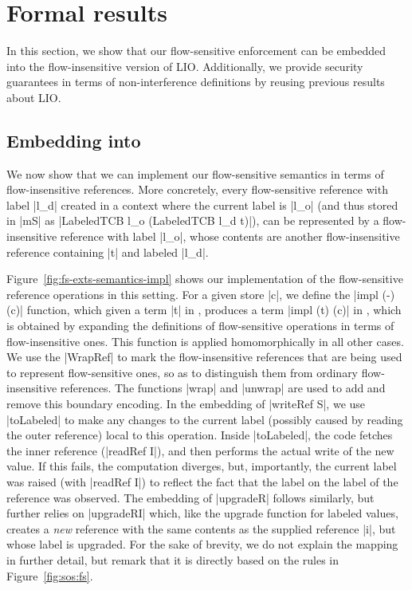 \section{Formal results}
\label{sec:soundness}

In this section, we show that our flow-sensitive enforcement can be
embedded into the flow-insensitive version of LIO. Additionally, we
provide security guarantees in terms of non-interference definitions by reusing
previous results about LIO.

\subsection{Embedding into \lio{}}

We now show that we can implement our flow-sensitive semantics in terms of
flow-insensitive references. More concretely, every flow-sensitive reference
with label |l_d| created in a context where the current label is |l_o| (and
thus stored in |mS| as |LabeledTCB l_o (LabeledTCB l_d t)|), can be represented
by a flow-insensitive reference with label |l_o|, whose contents are
another flow-insensitive reference containing |t| and labeled |l_d|.

Figure~\ref{fig:fs-exts-semantics-impl} shows our implementation of
the flow-sensitive reference operations in this setting.  For a given
store |c|, we define the |impl (-) (c)| function, which given a term
|t| in \liofs{}, produces a term |impl (t) (c)| in \lio{}, which is
obtained by expanding the definitions of flow-sensitive operations in
terms of flow-insensitive ones. This function is applied
homomorphically in all other cases. We use the |WrapRef| to mark
the flow-insensitive references that are being used to represent
flow-sensitive ones, so as to distinguish them from ordinary
flow-insensitive references. The functions |wrap| and |unwrap| are
used to add and remove this boundary encoding.
%
In the embedding of |writeRef S|, we use |toLabeled| to make any
changes to the current label (possibly caused by reading the outer
reference) local to this operation. Inside |toLabeled|, the code
fetches the inner reference (|readRef I|), and then performs the
actual write of the new value.  If this fails, the computation
diverges, but, importantly, the current label was raised (with
|readRef I|) to reflect the fact that the label on the label of the
reference was observed.
%
The embedding of |upgradeR| follows similarly, but further relies on
|upgradeRI| which, like the upgrade function for labeled values,
creates a \emph{new} reference with the same contents as the supplied
reference |i|, but whose label is upgraded.
%
For the sake of brevity, we do not explain the mapping in further
detail, but remark that it is directly based on the rules in
Figure~\ref{fig:sos:fs}.
%

